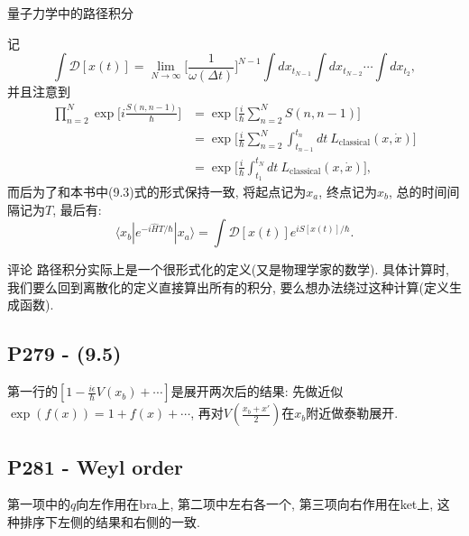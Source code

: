 \begin{mybox}{量子力学中的路径积分}
\begin{enumerate}
          记
          \begin{equation}
            \int\mathcal{D}[x(t)] = \lim_{N\rightarrow \infty}\biggl[\frac{1}{\omega(\Delta t)}\biggr]^{N-1}\int dx_{t_{N-1}}\int dx_{t_{N-2}} \cdots \int dx_{t_2},
          \end{equation}
          并且注意到
          \begin{equation}
            \begin{aligned}
              \prod_{n=2}^{N}\exp\biggl[i\frac{S(n,n-1)}{\hbar}\biggr] &= \exp\biggl[\frac{i}{\hbar}\sum_{n=2}^{N}S(n,n-1)\biggr] \\
              &= \exp\biggl[\frac{i}{\hbar}\sum_{n=2}^{N}\int_{t_{n-1}}^{t_n}dt\ L_\text{classical}(x, \dot{x})\biggr] \\
              &= \exp\biggl[\frac{i}{\hbar}\int_{t_1}^{t_N}dt\ L_\text{classical}(x, \dot{x})\biggr],
            \end{aligned}
          \end{equation}
          而后为了和本书中(9.3)式的形式保持一致, 将起点记为$x_a$, 终点记为$x_b$, 总的时间间隔记为$T$, 最后有:
          \begin{equation}
            \langle x_b|e^{-i\hat{H}T/\hbar}|x_a \rangle = \int\mathcal{D}[x(t)]e^{iS[x(t)]/\hbar}.
          \end{equation}

  \end{enumerate}
\end{mybox}

\begin{mybox}{评论}
  路径积分实际上是一个很形式化的定义(又是物理学家的数学).
  具体计算时, 我们要么回到离散化的定义直接算出所有的积分, 要么想办法绕过这种计算(定义生成函数).
\end{mybox}

\subsection{P279 - (9.5)}

第一行的$[1-\frac{i\epsilon}{\hbar}V(x_b)+\cdots]$是展开两次后的结果: 先做近似$\exp(f(x)) = 1 + f(x) + \cdots$, 再对$V(\frac{x_b + x'}{2})$在$x_b$附近做泰勒展开.

\subsection{P281 - Weyl order}

第一项中的$q$向左作用在bra上, 第二项中左右各一个, 第三项向右作用在ket上, 这种排序下左侧的结果和右侧的一致.

